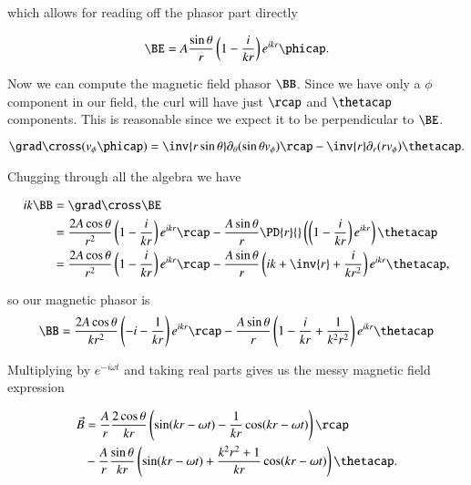 which allows for reading off the phasor part directly

\begin{equation}\label{eqn:relElectroDynProblemSet4:580}
\BE = A \frac{\sin\theta}{r} \left( 1 - \frac{i}{k r} \right) e^{i k r} \phicap.
\end{equation}

Now we can compute the magnetic field phasor $\BB$.  Since we have only a $\phi$ component in our field, the curl will have just $\rcap$ and $\thetacap$ components.  This is reasonable since we expect it to be perpendicular to $\BE$.

\begin{equation}\label{eqn:relElectroDynProblemSet4:590}
\grad \cross (v_\phi \phicap) 
= \inv{r \sin\theta} \partial_\theta (\sin\theta v_\phi) \rcap
- \inv{r } \partial_r (r v_\phi) \thetacap.
\end{equation}

Chugging through all the algebra we have

\begin{align*}
i k \BB 
&=
\grad \cross \BE \\
&=
\frac{2 A \cos\theta}{r^2} 
\left( 1 - \frac{i}{k r} \right) e^{i k r} 
\rcap
- \frac{A\sin\theta}{r } \PD{r}{} \left( \left( 1 - \frac{i}{k r} \right) e^{i k r} \right)
\thetacap \\
&=
\frac{2 A \cos\theta}{r^2} 
\left( 1 - \frac{i}{k r} \right) e^{i k r} 
\rcap
- \frac{A\sin\theta}{r } \left( i k + \inv{r} + \frac{i}{k r^2} \right) e^{i k r} 
\thetacap,
\end{align*}

so our magnetic phasor is
\begin{equation}\label{eqn:relElectroDynProblemSet4:600}
\BB =
\frac{2 A \cos\theta}{k r^2} 
\left( -i - \frac{1}{k r} \right) e^{i k r} 
\rcap
- \frac{A\sin\theta}{r} \left( 1 - \frac{i}{k r} + \frac{1}{k^2 r^2} \right) e^{i k r} 
\thetacap
\end{equation}

Multiplying by $e^{-i\omega t}$ and taking real parts gives us the messy magnetic field expression

\begin{equation}\label{eqn:relElectroDynProblemSet4:610}
\begin{aligned}
\vec{B} 
&=
\frac{A}{r} \frac{2 \cos\theta}{k r} 
\left( \sin(k r - \omega t)
- \frac{1}{k r} \cos(k r - \omega t) \right)
\rcap \\
&- \frac{A}{r} \frac{\sin\theta}{k r}
\left(
\sin(k r - \omega t)
+ \frac{k^2 r^2 + 1}{k r}
\cos(k r - \omega t)
\right)
\thetacap.
\end{aligned}
\end{equation}

